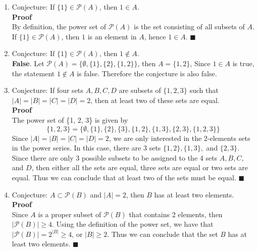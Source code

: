 \documentclass[11pt, oneside]{article}   	%
\newcommand*{\QEDA}{\hfill\ensuremath{\blacksquare}}         %
\begin{document}
\begin{enumerate}[ (a)]
           
    \item Conjecture: If $\{1\} \in \mathcal{P}(A)$, then $1 \in A$.
    \vspace{0.3cm}\\
    \textbf{Proof}
    \vspace{0.1cm}\\
    By definition, the power set of $\mathcal{P}(A)$ is the set consisting of all subsets of $A$. If $\{1\} \in \mathcal{P}(A)$, then $1$ is an element in $A$, hence $1 \in A$. \QEDA
    
    \item Conjecture: If $\{1\} \in \mathcal{P}(A)$, then $1 \notin A$.
    \vspace{0.3cm}\\
    \textbf{False}. Let $\mathcal{P}(A) = \{ \emptyset, \{1\}, \{2\}, \{1, 2\} \}$, then $A = \{1, 2\}$, Since $1 \in A$ is true, the statement $1 \notin A$ is false. Therefore the conjecture is also false.
    
    \item Conjecture:     If four sets $A, B, C, D$ are subsets of $\{1, 2, 3\}$ such that $|A| = |B| = |C| = |D| = 2$, then at least two of these sets are equal.
    \vspace{0.3cm}\\
    \textbf{Proof}
    \vspace{0.1cm}\\
    The power set of \{1, 2, 3\} is given by 
    $$ \{1, 2, 3\} = \{ \emptyset, \{1\}, \{2\}, \{3\}, \{1, 2\}, \{1, 3\}, \{2, 3\}, \{1, 2, 3\} \}$$
   Since $|A| = |B| = |C| = |D| = 2$, we are only interested in the 2-elements sets in the power series. In this case, there are 3 sets $\{1, 2\}, \{1, 3\},$ and $\{2, 3\}$. Since there are only 3 possible subsets to be assigned to the 4 sets $A, B, C,$ and $D$, then either all the sets are equal, three sets are equal or two sets are equal. Thus we can conclude that at least two of the sets must be equal. \QEDA

    \item Conjecture: $A \subset \mathcal{P}(B)$ and $|A| = 2$, then $B$ has at least two elements.
    \vspace{0.3cm}\\
    \textbf{Proof}
    \vspace{0.1cm}\\
    Since $A$ is a proper subset of $\mathcal{P}(B)$ that contains 2 elements, then $|\mathcal{P}(B)| \geq 4$. Using the definition of the power set, we have that $|\mathcal{P}(B)| = 2^{|B|} \geq 4$, or $|B| \geq 2$. Thus we can conclude that the set $B$ has at least two elements. \QEDA
        
\end{enumerate}
\end{document}
